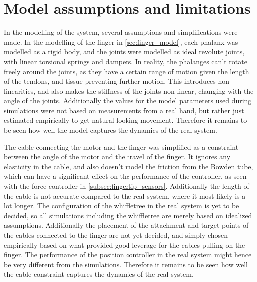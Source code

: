 \section{Model assumptions and limitations}%
\label{sec:discussion_model_assumptions}

In the modelling of the system, several assumptions and simplifications were made. In the modelling of the finger in \cref{sec:finger_model}, each phalanx was modelled as a rigid body, and the joints were modelled as ideal revolute joints, with linear torsional springs and dampers. In reality, the phalanges can't rotate freely around the joints, as they have a certain range of motion given the length of the tendons, and tissue preventing further motion. This introduces non-linearities, and also makes the stiffness of the joints non-linear, changing with the angle of the joints. Additionally the values for the model parameters used during simulations were not based on measurements from a real hand, but rather just estimated empirically to get natural looking movement. Therefore it remains to be seen how well the model captures the dynamics of the real system.

The cable connecting the motor and the finger was simplified as a constraint between the angle of the motor and the travel of the finger. It ignores any elasticity in the cable, and also doesn't model the friction from the Bowden tube, which can have a significant effect on the performance of the controller, as seen with the force controller in \cref{subsec:fingertip_sensors}. Additionally the length of the cable is not accurate compared to the real system, where it most likely is a lot longer. The configuration of the whiffletree in the real system is yet to be decided, so all simulations including the whiffletree are merely based on idealized assumptions. Additionally the placement of the attachment and target points of the cables connected to the finger are not yet decided, and simply chosen empirically based on what provided good leverage for the cables pulling on the finger. The performance of the position controller in the real system might hence be very different from the simulations. Therefore it remains to be seen how well the cable constraint captures the dynamics of the real system.

